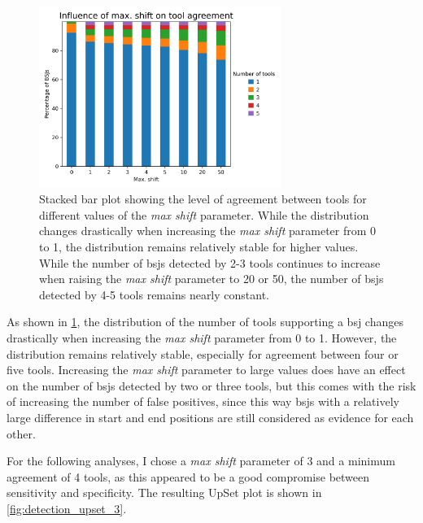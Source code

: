 \begin{figure}[ht]
    \centering

    \includegraphics[width=0.7\textwidth]{chapters/4_results_and_discussion/figures/detection/shift_agreement.png}
    \caption{Stacked bar plot showing the level of agreement between tools for
        different values of the \textit{max shift} parameter.
        While the distribution changes drastically when increasing the \textit{max
            shift} parameter from 0 to 1, the distribution remains relatively stable for
        higher values.
        While the number of \gls{bsj}s detected by 2-3 tools continues to increase when
        raising the \textit{max shift} parameter to 20 or 50, the number of \gls{bsj}s
        detected by 4-5 tools remains nearly constant.
    }
    \label{fig:shift_agreement}
\end{figure}

As shown in \cref{fig:shift_agreement}, the distribution of the number of tools
supporting a \gls{bsj} changes drastically when increasing the \textit{max
    shift} parameter from 0 to 1.
However, the distribution remains relatively stable, especially for agreement
between four or five tools.
Increasing the \textit{max shift} parameter to large values does have an effect
on the number of \gls{bsj}s detected by two or three tools, but this comes with
the risk of increasing the number of false positives, since this way \gls{bsj}s
with a relatively large difference in start and end positions are still
considered as evidence for each other.

For the following analyses, I chose a \textit{max shift} parameter of 3 and a
minimum agreement of 4 tools, as this appeared to be a good compromise between
sensitivity and specificity.
The resulting UpSet plot is shown in \cref{fig:detection_upset_3}.

